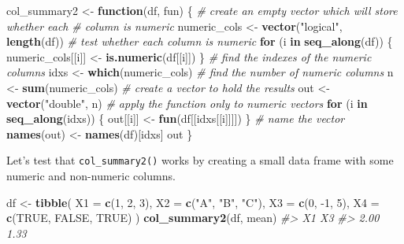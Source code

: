 \documentclass[]{book}
\newenvironment{Shaded}{\begin{snugshade}}{\end{snugshade}}
\newcommand{\CommentTok}[1]{\textcolor[rgb]{0.56,0.35,0.01}{\textit{#1}}}
\newcommand{\ControlFlowTok}[1]{\textcolor[rgb]{0.13,0.29,0.53}{\textbf{#1}}}
\newcommand{\DataTypeTok}[1]{\textcolor[rgb]{0.13,0.29,0.53}{#1}}
\newcommand{\DecValTok}[1]{\textcolor[rgb]{0.00,0.00,0.81}{#1}}
\newcommand{\KeywordTok}[1]{\textcolor[rgb]{0.13,0.29,0.53}{\textbf{#1}}}
\newcommand{\NormalTok}[1]{#1}
\newcommand{\OtherTok}[1]{\textcolor[rgb]{0.56,0.35,0.01}{#1}}
\newcommand{\StringTok}[1]{\textcolor[rgb]{0.31,0.60,0.02}{#1}}
\theoremstyle{plain}
\theoremstyle{remark}
\begin{document}
\begin{Shaded}
\begin{Highlighting}[]
\NormalTok{col_summary2 <-}\StringTok{ }\ControlFlowTok{function}\NormalTok{(df, fun) \{}
  \CommentTok{# create an empty vector which will store whether each }
  \CommentTok{# column is numeric}
\NormalTok{  numeric_cols <-}\StringTok{ }\KeywordTok{vector}\NormalTok{(}\StringTok{"logical"}\NormalTok{, }\KeywordTok{length}\NormalTok{(df))}
  \CommentTok{# test whether each column is numeric}
  \ControlFlowTok{for}\NormalTok{ (i }\ControlFlowTok{in} \KeywordTok{seq_along}\NormalTok{(df)) \{}
\NormalTok{    numeric_cols[[i]] <-}\StringTok{ }\KeywordTok{is.numeric}\NormalTok{(df[[i]])}
\NormalTok{  \}}
  \CommentTok{# find the indexes of the numeric columns}
\NormalTok{  idxs <-}\StringTok{ }\KeywordTok{which}\NormalTok{(numeric_cols)}
  \CommentTok{# find the number of numeric columns}
\NormalTok{  n <-}\StringTok{ }\KeywordTok{sum}\NormalTok{(numeric_cols)}
  \CommentTok{# create a vector to hold the results}
\NormalTok{  out <-}\StringTok{ }\KeywordTok{vector}\NormalTok{(}\StringTok{"double"}\NormalTok{, n)}
  \CommentTok{# apply the function only to numeric vectors}
  \ControlFlowTok{for}\NormalTok{ (i }\ControlFlowTok{in} \KeywordTok{seq_along}\NormalTok{(idxs)) \{}
\NormalTok{    out[[i]] <-}\StringTok{ }\KeywordTok{fun}\NormalTok{(df[[idxs[[i]]]])}
\NormalTok{  \}}
  \CommentTok{# name the vector }
  \KeywordTok{names}\NormalTok{(out) <-}\StringTok{ }\KeywordTok{names}\NormalTok{(df)[idxs]}
\NormalTok{  out}
\NormalTok{\}}
\end{Highlighting}
\end{Shaded}

Let's test that \texttt{col\_summary2()} works by creating a small data frame with
some numeric and non-numeric columns.

\begin{Shaded}
\begin{Highlighting}[]
\NormalTok{df <-}\StringTok{ }\KeywordTok{tibble}\NormalTok{(}
  \DataTypeTok{X1 =} \KeywordTok{c}\NormalTok{(}\DecValTok{1}\NormalTok{, }\DecValTok{2}\NormalTok{, }\DecValTok{3}\NormalTok{),}
  \DataTypeTok{X2 =} \KeywordTok{c}\NormalTok{(}\StringTok{"A"}\NormalTok{, }\StringTok{"B"}\NormalTok{, }\StringTok{"C"}\NormalTok{),}
  \DataTypeTok{X3 =} \KeywordTok{c}\NormalTok{(}\DecValTok{0}\NormalTok{, }\DecValTok{-1}\NormalTok{, }\DecValTok{5}\NormalTok{),}
  \DataTypeTok{X4 =} \KeywordTok{c}\NormalTok{(}\OtherTok{TRUE}\NormalTok{, }\OtherTok{FALSE}\NormalTok{, }\OtherTok{TRUE}\NormalTok{)}
\NormalTok{)}
\KeywordTok{col_summary2}\NormalTok{(df, mean)}
\CommentTok{#>   X1   X3 }
\CommentTok{#> 2.00 1.33}
\end{Highlighting}
\end{Shaded}
\end{document}
